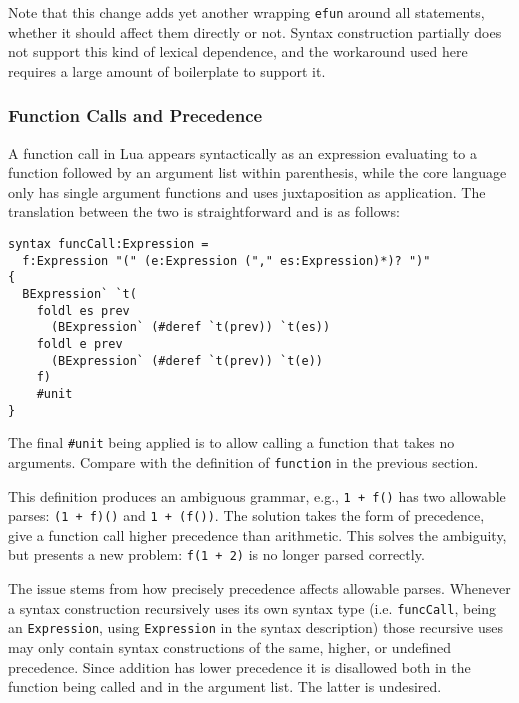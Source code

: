 \documentclass{kththesis}
\begin{document}
Note that this change adds yet another wrapping \texttt{efun} around all statements, whether it should affect them directly or not. Syntax construction partially does not support this kind of lexical dependence, and the workaround used here requires a large amount of boilerplate to support it.

\subsubsection{Function Calls and Precedence} \label{sec:lua-func-call-precedence}

A function call in Lua appears syntactically as an expression evaluating to a function followed by an argument list within parenthesis, while the core language only has single argument functions and uses juxtaposition as application. The translation between the two is straightforward and is as follows:

\begin{verbatim}
syntax funcCall:Expression =
  f:Expression "(" (e:Expression ("," es:Expression)*)? ")"
{
  BExpression` `t(
    foldl es prev
      (BExpression` (#deref `t(prev)) `t(es))
    foldl e prev
      (BExpression` (#deref `t(prev)) `t(e))
    f)
    #unit
}
\end{verbatim}

The final \texttt{#unit} being applied is to allow calling a function that takes no arguments. Compare with the definition of \texttt{function} in the previous section. %

This definition produces an ambiguous grammar, e.g., \texttt{1 + f()} has two allowable parses: \texttt{(1 + f)()} and \texttt{1 + (f())}. The solution takes the form of precedence, give a function call higher precedence than arithmetic. This solves the ambiguity, but presents a new problem: \texttt{f(1 + 2)} is no longer parsed correctly.

The issue stems from how precisely precedence affects allowable parses. Whenever a syntax construction recursively uses its own syntax type (i.e. \texttt{funcCall}, being an \texttt{Expression}, using \texttt{Expression} in the syntax description) those recursive uses may only contain syntax constructions of the same, higher, or undefined precedence. Since addition has lower precedence it is disallowed both in the function being called and in the argument list. The latter is undesired.
\end{document}
